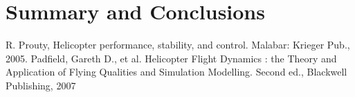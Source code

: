 \documentclass[11pt,a4paper]{article}
\begin{document}
\section{Summary and Conclusions}


\begin{thebibliography}{}
R. Prouty, Helicopter performance, stability, and control. Malabar: Krieger Pub., 2005.
 Padfield, Gareth D., et al. Helicopter Flight Dynamics : the Theory and Application of Flying Qualities and
Simulation Modelling. Second ed., Blackwell Publishing, 2007
\end{thebibliography}{}
\end{document}

